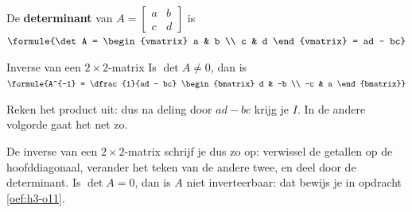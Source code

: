 \begin{theorie}
De \textbf{\textcolor{accent}{determinant}} van $A = \begin{bmatrix} a & b \\ c & d \end{bmatrix}$ is \quad $\formule{\det A = \begin{vmatrix} a & b \\ c & d \end{vmatrix} = ad - bc}$

\begin{stelling}{Inverse van een $2 \times 2$-matrix}
Is $\det A \neq 0$, dan is \quad $\formule{A^{-1} = \dfrac{1}{ad - bc} \begin{bmatrix} d & -b \\ -c & a \end{bmatrix}}$
\end{stelling}

\begin{bewijs}
Reken het product uit:
dus na deling door $ad - bc$ krijg je $I$. In de andere volgorde gaat het net zo.
\end{bewijs}
\end{theorie}

De inverse van een $2 \times 2$-matrix schrijf je dus zo op: verwissel de getallen op de hoofddiagonaal, verander het teken van de andere twee, en deel door de determinant. Is $\det A = 0$, dan is $A$ niet inverteerbaar: dat bewijs je in opdracht \ref{oef:h3-o11}.



